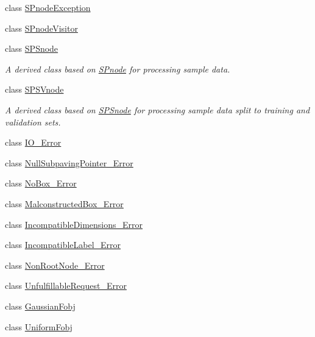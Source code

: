 \begin{DoxyCompactItemize}
class \hyperlink{classsubpavings_1_1SPnodeException}{\-S\-Pnode\-Exception}
\item 
class \hyperlink{classsubpavings_1_1SPnodeVisitor}{\-S\-Pnode\-Visitor}
\item 
class \hyperlink{classsubpavings_1_1SPSnode}{\-S\-P\-Snode}
\begin{DoxyCompactList}\small\item\em \-A derived class based on \hyperlink{classsubpavings_1_1SPnode}{\-S\-Pnode} for processing sample data. \end{DoxyCompactList}\item 
class \hyperlink{classsubpavings_1_1SPSVnode}{\-S\-P\-S\-Vnode}
\begin{DoxyCompactList}\small\item\em \-A derived class based on \hyperlink{classsubpavings_1_1SPSnode}{\-S\-P\-Snode} for processing sample data split to training and validation sets. \end{DoxyCompactList}\item 
class \hyperlink{classsubpavings_1_1IO__Error}{\-I\-O\-\_\-\-Error}
\item 
class \hyperlink{classsubpavings_1_1NullSubpavingPointer__Error}{\-Null\-Subpaving\-Pointer\-\_\-\-Error}
\item 
class \hyperlink{classsubpavings_1_1NoBox__Error}{\-No\-Box\-\_\-\-Error}
\item 
class \hyperlink{classsubpavings_1_1MalconstructedBox__Error}{\-Malconstructed\-Box\-\_\-\-Error}
\item 
class \hyperlink{classsubpavings_1_1IncompatibleDimensions__Error}{\-Incompatible\-Dimensions\-\_\-\-Error}
\item 
class \hyperlink{classsubpavings_1_1IncompatibleLabel__Error}{\-Incompatible\-Label\-\_\-\-Error}
\item 
class \hyperlink{classsubpavings_1_1NonRootNode__Error}{\-Non\-Root\-Node\-\_\-\-Error}
\item 
class \hyperlink{classsubpavings_1_1UnfulfillableRequest__Error}{\-Unfulfillable\-Request\-\_\-\-Error}
\item 
class \hyperlink{classsubpavings_1_1GaussianFobj}{\-Gaussian\-Fobj}
\item 
class \hyperlink{classsubpavings_1_1UniformFobj}{\-Uniform\-Fobj}
\end{DoxyCompactItemize}
